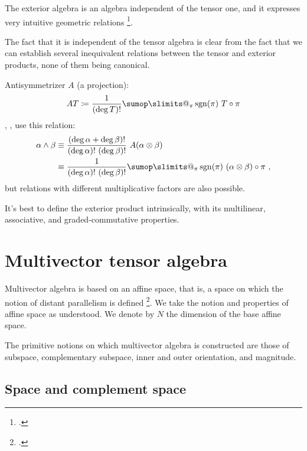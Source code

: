 \documentclass[\ifafour a4paper,12pt,\else a5paper,10pt,\fi%
onecolumn,oneside,article,%
british%
]{memoir}
\makeatletter
\theoremstyle{remark}
\theoremstyle{innote}
\def\sum{\DOTSI\sumop\slimits@}
\newcommand*{\citep}{\footcites}
\newcommand*{\defd}{\coloneqq}
\renewcommand*{\|}[1][]{\nonscript\:#1\vert\nonscript\:\mathopen{}}
\newcommand*{\cf}{{cf.}}
\DeclareMathOperator{\sgn}{sgn}
\makeatother
\begin{document}
The exterior algebra is an algebra independent of the tensor one, and it
expresses very intuitive geometric relations
\citep[\cf][]{deschamps1970,deschamps1981}.

The fact that it is independent of the tensor algebra is clear from the
fact that we can establish several inequivalent relations between the tensor and
exterior products, none of them being canonical.


Antisymmetrizer $A$ (a projection):
\begin{equation}
  \label{eq:antisymmetrizer}
  AT \defd \frac{1}{(\deg T)!} \sum_{\pi}\sgn(\pi)\ T\circ\pi
\end{equation}
\textcite{abrahametal1983_r1988}, \textcite{choquetbruhatetal1977_r1996},
\textcite{bossavit1991} use this relation:
\begin{equation}
  \label{eq:wedge_marsden}
  \begin{split}
    \alpha \land \beta &\equiv
    \frac{(\deg \alpha+\deg \beta)!}{(\deg \alpha)!\ (\deg \beta)!}\ 
    A(\alpha \otimes \beta)
  \\
  &\equiv \frac{1}{(\deg \alpha)!\ (\deg \beta)!}
  \sum_{\pi}\sgn(\pi)\ (\alpha \otimes \beta)\circ\pi \ ,
\end{split}
\end{equation}
but relations with different multiplicative factors are also possible.

It's best to define the exterior product intrinsically, with its
multilinear, associative, and graded-commutative properties.


\section{Multivector tensor algebra}
\label{sec:multivector_tensor}

Multivector algebra is based on an affine space, that is, a space on which
the notion of distant parallelism is defined \citep{portamana2011_r2019}.
We take the notion and properties of affine space as understood. We denote
by $N$ the dimension of the base affine space.

The primitive notions on which multivector algebra is constructed are those
of subspace, complementary subspace, inner and outer orientation, and magnitude.


\subsection{Space and complement space}
\label{sec:complement}
\end{document}
